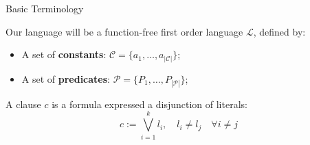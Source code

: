 \documentclass{beamer}
\begin{document}
\begin{frame}{Basic Terminology}
	\begin{definition}
		Our language will be a function-free first order language $\mathcal{L}$, defined by:
		\begin{itemize}
			\item A set of \textbf{constants}: $\mathcal{C}=\{a_1,\dots,a_{|\mathcal{C}|}\}$;
			\item A set of \textbf{predicates}: $\mathcal{P}=\{P_1,\dots,P_{|\mathcal{P}|}\}$;
		\end{itemize}
	\end{definition}

	
	\begin{definition}[Clause]
		A clause $c$ is a formula expressed a disjunction of literals:
		\begin{equation*}
		c:=\bigvee_{i=1}^{k} l_{i}, \quad l_{i} \neq l_{j} \quad \forall i \neq j
		\end{equation*}
	\end{definition}
\end{frame}

%	
%	
%	
\end{document}
